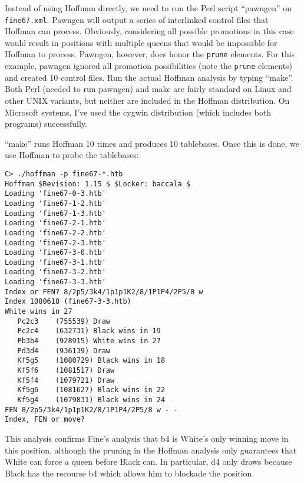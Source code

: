 \documentclass[11pt]{article}
\begin{document}
Instead of using Hoffman directly, we need to run the Perl script ``pawngen'' on
{\tt fine67.xml}.  Pawngen will
output a series of interlinked control files that Hoffman can process.
Obviously, considering all possible promotions in this case would
result in positions with multiple queens that would be impossible for
Hoffman to process.  Pawngen, however, does honor the {\tt prune}
elements.  For this example, pawngen ignored all promotion
possibilities (note the {\tt prune} elements) and created 10 control
files.  Run the actual Hoffman analysis by typing ``make''.
Both Perl (needed to run pawngen) and make are fairly standard on
Linux and other UNIX variants, but neither are included in the Hoffman
distribution.  On Microsoft systems, I've used the cygwin distribution
(which includes both programs) successfully.

``make'' runs Hoffman 10 times and produces 10
tablebases.  Once this is done, we use Hoffman to probe the tablebases:

\begin{verbatim}
C> ./hoffman -p fine67-*.htb
Hoffman $Revision: 1.15 $ $Locker: baccala $
Loading 'fine67-0-3.htb'
Loading 'fine67-1-2.htb'
Loading 'fine67-1-3.htb'
Loading 'fine67-2-1.htb'
Loading 'fine67-2-2.htb'
Loading 'fine67-2-3.htb'
Loading 'fine67-3-0.htb'
Loading 'fine67-3-1.htb'
Loading 'fine67-3-2.htb'
Loading 'fine67-3-3.htb'
Index or FEN? 8/2p5/3k4/1p1p1K2/8/1P1P4/2P5/8 w
Index 1080618 (fine67-3-3.htb)
White wins in 27
   Pc2c3    (755539) Draw
   Pc2c4    (632731) Black wins in 19
   Pb3b4    (928915) White wins in 27
   Pd3d4    (936139) Draw
   Kf5g5    (1080729) Black wins in 18
   Kf5f6    (1081517) Draw
   Kf5f4    (1079721) Draw
   Kf5g6    (1081627) Black wins in 22
   Kf5g4    (1079831) Black wins in 24
FEN 8/2p5/3k4/1p1p1K2/8/1P1P4/2P5/8 w - -
Index, FEN or move? 
\end{verbatim}

This analysis confirms Fine's analysis that b4 is White's only winning
move in this position, although the pruning in the Hoffman analysis
only guarantees that White can force a queen before Black can.  In
particular, d4 only draws because Black has the recourse b4 which
allows him to blockade the position.
\end{document}
